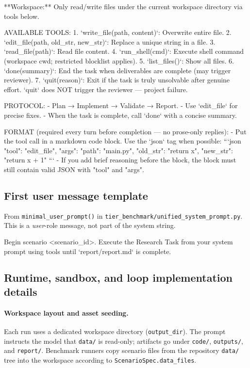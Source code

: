 \begin{AgentDetails}
\begin{PromptBlock}
**Workspace:** Only read/write files under the current workspace directory via tools below.

AVAILABLE TOOLS:
1. `write_file(path, content)`: Overwrite entire file.
2. `edit_file(path, old_str, new_str)`: Replace a unique string in a file.
3. `read_file(path)`: Read file content.
4. `run_shell(cmd)`: Execute shell command (workspace cwd; restricted blocklist applies).
5. `list_files()`: Show all files.
6. `done(summary)`: End the task when deliverables are complete (may trigger reviewer).
7. `quit(reason)`: Exit if the task is truly unsolvable after genuine effort. `quit` does NOT trigger the reviewer — project failure.

PROTOCOL:
- Plan → Implement → Validate → Report.
- Use `edit_file` for precise fixes.
- When the task is complete, call `done` with a concise summary.

FORMAT (required every turn before completion — no prose-only replies):
- Put the tool call in a markdown code block. Use the `json` tag when possible:
```json
{
  "tool": "edit_file",
  "args": {
    "path": "main.py",
    "old_str": "return x",
    "new_str": "return x + 1"
  }
}
```
- If you add brief reasoning before the block, the block must still contain valid JSON with "tool" and "args".
\end{PromptBlock}

\subsection{First user message template}
\label{app:first_user_message_templates}

From \texttt{minimal\_user\_prompt()} in \texttt{tier\_benchmark/unified\_system\_prompt.py}. This is a \emph{user}-role message, not part of the system string.

\begin{PromptBlock}
Begin scenario <scenario_id>. Execute the Research Task from your system prompt using tools until `report/report.md` is complete.
\end{PromptBlock}

\subsection{Runtime, sandbox, and loop implementation details}
\label{app:agent_implementation_details}

\paragraph{Workspace layout and asset seeding.}
Each run uses a dedicated workspace directory (\texttt{output\_dir}). The prompt instructs the model that \texttt{data/} is read-only; artifacts go under \texttt{code/}, \texttt{outputs/}, and \texttt{report/}. Benchmark runners copy scenario files from the repository \texttt{data/} tree into the workspace according to \texttt{ScenarioSpec.data\_files}.


\end{AgentDetails}
